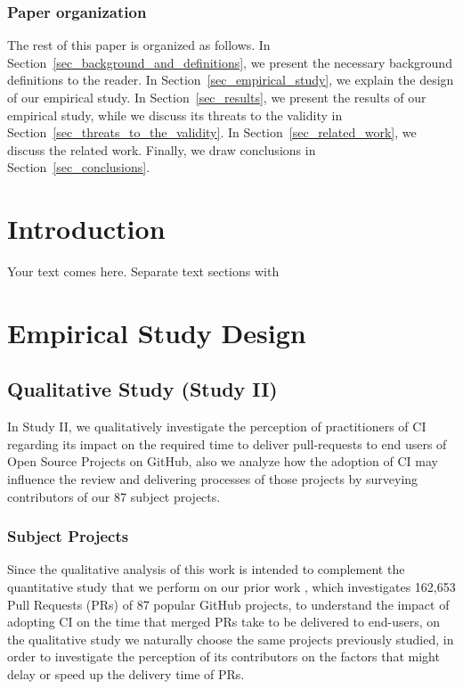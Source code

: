 	\subsubsection*{\textbf{Paper organization}} The rest of this paper is
	organized as follows. In Section~\ref{sec_background_and_definitions}, we
	present the necessary background definitions to the reader. In
	Section~\ref{sec_empirical_study}, we explain the design of our empirical
	study. In Section~\ref{sec_results}, we present the results of our empirical
	study, while we discuss its threats to the validity in
	Section~\ref{sec_threats_to_the_validity}. In Section~\ref{sec_related_work},
	we discuss the related work. Finally, we draw conclusions in
	Section~\ref{sec_conclusions}. 
	
	\section{Introduction}
	\label{sec:intro}
	Your text comes here. Separate text sections with
	\section{Empirical Study Design}
	\label{sec:empirical_study_design}
	
	\subsection{Qualitative Study (Study II)}
	\label{sec:qualitative_study}
	
	In Study II, we qualitatively investigate the perception of practitioners of CI regarding its impact on the required time to deliver pull-requests to end users of Open Source Projects on GitHub, also we analyze how the adoption of CI may influence the review and delivering processes of those projects by surveying contributors of our 87 subject projects.
	
	\subsubsection{Subject Projects}
	\label{sec:subject_projects}
	
	Since the qualitative analysis of this work is intended to complement the quantitative study that we perform on our prior work \cite{bernardo2018studying} , which investigates 162,653 Pull Requests (PRs) of 87 popular GitHub projects, to understand the impact of adopting CI on the time that merged PRs take to be delivered to end-users, on the qualitative study we naturally choose the same projects previously studied, in order to investigate the perception of its contributors on the factors that might delay or speed up the delivery time of PRs.
	
